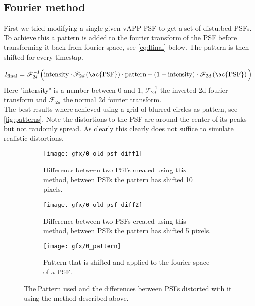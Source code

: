\subsection{Fourier method}
First we tried modifying a single given \ac{vAPP} \ac{PSF} to get a set of disturbed \acp{PSF}. To achieve this a pattern is added to the fourier transform of the \ac{PSF} before transforming it back from fourier space, see \autoref{eq:Ifinal} below. The pattern is then shifted for every timestap.

\begin{equation}
I_{\text{final}} = \mathscr{F}_{2d}^{-1} \Big( \text{intensity} \cdot \mathscr{F}_{2d}\left(\text{\ac{PSF}}\right) \cdot \text{pattern} + \left(1-\text{intensity}\right) \cdot \mathscr{F}_{2d}\left(\text{\ac{PSF}}\right) \Big) \label{eq:Ifinal}
\end{equation}
Here "intensity" is a number between $0$ and $1$, $\mathscr{F}_{2d}^{-1}$ the inverted 2d fourier transform and $\mathscr{F}_{2d}$ the normal 2d fourier transform.\\

The best results where achieved using a grid of blurred circles as pattern, see \autoref{fig:patterns}. Note the distortions to the \ac{PSF} are around the center of its peaks but not randomly spread. As clearly this clearly does not suffice to simulate realistic distortions.

\begin{figure}[h!]
      \begin{subfigure}[t]{0.5\textwidth}
        \texttt{[image: gfx/0\_old\_psf\_diff1]}
        \caption{Difference between two \acp{PSF}  created using this method, between \acp{PSF} the pattern has shifted 10 pixels.}
      \end{subfigure}%
      \begin{subfigure}[t]{0.5\textwidth}
        \texttt{[image: gfx/0\_old\_psf\_diff2]}
        \caption{Difference between two \acp{PSF}  created using this method, between \acp{PSF} the pattern has shifted 5 pixels.}
      \end{subfigure}
      
      \begin{subfigure}[]{0.5\textwidth}
        \texttt{[image: gfx/0\_pattern]}
        \caption{Pattern that is shifted and applied to the fourier space of a \ac{PSF}.}
      \end{subfigure}
      
  \caption{The Pattern used and the differences between \acp{PSF} distorted with it using the method described above.}
  \label{fig:patterns}
\end{figure}

